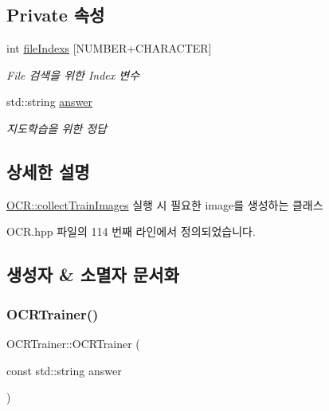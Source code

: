 \subsection*{Private 속성}
\begin{DoxyCompactItemize}
\item 
\mbox{\label{class_o_c_r_trainer_a9d8b8a5e578dfbe9b71f86d80662c667}} 
int \hyperlink{class_o_c_r_trainer_a9d8b8a5e578dfbe9b71f86d80662c667}{file\+Indexs} \mbox{[}N\+U\+M\+B\+ER+C\+H\+A\+R\+A\+C\+T\+ER\mbox{]}
\begin{DoxyCompactList}\small\item\em File 검색을 위한 Index 변수 \end{DoxyCompactList}\item 
\mbox{\label{class_o_c_r_trainer_a8581e40fcbb646332572248938094b81}} 
std\+::string \hyperlink{class_o_c_r_trainer_a8581e40fcbb646332572248938094b81}{answer}
\begin{DoxyCompactList}\small\item\em 지도학습을 위한 정답 \end{DoxyCompactList}\end{DoxyCompactItemize}


\subsection{상세한 설명}
\hyperlink{class_o_c_r_a9d4b78ff145b1e89ac05eb0f194d1948}{O\+C\+R\+::collect\+Train\+Images} 실행 시 필요한 image를 생성하는 클래스 

O\+C\+R.\+hpp 파일의 114 번째 라인에서 정의되었습니다.



\subsection{생성자 \& 소멸자 문서화}
\mbox{\label{class_o_c_r_trainer_abd29826f033646e6937bc07af133d599}} 
\subsubsection{\texorpdfstring{O\+C\+R\+Trainer()}{OCRTrainer()}}
{\footnotesize\ttfamily O\+C\+R\+Trainer\+::\+O\+C\+R\+Trainer (\begin{DoxyParamCaption}\item[{const std\+::string}]{answer }\end{DoxyParamCaption})}



